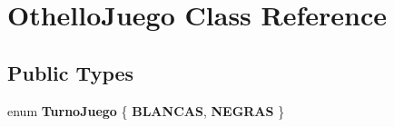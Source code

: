 \hypertarget{class_othello_juego}{}\section{Othello\+Juego Class Reference}
\label{class_othello_juego}
\subsection*{Public Types}
\begin{DoxyCompactItemize}
\item 
enum {\bfseries Turno\+Juego} \{ {\bfseries B\+L\+A\+N\+C\+AS}, 
{\bfseries N\+E\+G\+R\+AS}
 \}\hypertarget{class_othello_juego_a9ba6a653a4b503ecc4dce5f06ffc42a2}{}\label{class_othello_juego_a9ba6a653a4b503ecc4dce5f06ffc42a2}

\end{DoxyCompactItemize}
